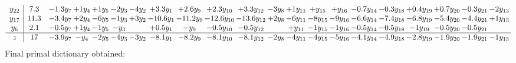 \documentclass[11pt]{article}
\begin{document}
\[\begin{array}{c| c c@{\hskip 2pt} c@{\hskip 2pt} c@{\hskip 2pt} c@{\hskip 2pt} c@{\hskip 2pt} c@{\hskip 2pt} c@{\hskip 2pt} c@{\hskip 2pt} c@{\hskip 2pt} c@{\hskip 2pt} c@{\hskip 2pt} c@{\hskip 2pt} c@{\hskip 2pt} c@{\hskip 2pt} c@{\hskip 2pt} c@{\hskip 2pt} c@{\hskip 2pt} c@{\hskip 2pt} c@{\hskip 2pt} }
 y_{22}   &  7.3 & -1.3 y_{7} & + 1 y_{4} & + 1 y_{5} & -2 y_{3} & -4 y_{2} & + 3.3 y_{1} & + 2.6 y_{9} & + 2.3 y_{10} & + 3.3 y_{12} & -3 y_{8} & + 1 y_{11} & +  y_{15} & +  y_{16} & -0.7 y_{14} & -0.3 y_{18} & + 0.4 y_{19} & + 0.7 y_{20} & -0.3 y_{21} & -2 y_{13}\\
 y_{17}   &  11.3 & -3.4 y_{7} & + 2 y_{4} & -6 y_{5} & -1 y_{3} & + 3 y_{2} & -10.6 y_{1} & -11.2 y_{9} & -12.6 y_{10} & -13.6 y_{12} & + 2 y_{8} & -6 y_{11} & -8 y_{15} & -9 y_{16} & -6.6 y_{14} & -7.4 y_{18} & -6.8 y_{19} & -5.4 y_{20} & -4.4 y_{21} & + 1 y_{13}\\
 y_{6}   &  2.1 & -0.5 y_{7} & + 1 y_{4} & -1 y_{5} & - y_{3} &   & + 0.5 y_{1} & - y_{9} & -0.5 y_{10} & -0.5 y_{12} &   & +  y_{11} & -1 y_{15} & -1 y_{16} & -0.5 y_{14} & -0.5 y_{18} & -1 y_{19} & -0.5 y_{20} & -0.5 y_{21} &   \\
\hline
z    &  17 & -3.9 y_{7} & - y_{4} & -2 y_{5} & -4 y_{3} & -3 y_{2} & -8.1 y_{1} & -8.2 y_{9} & -8.1 y_{10} & -8.1 y_{12} & -2 y_{8} & -4 y_{11} & -4 y_{15} & -5 y_{16} & -4.1 y_{14} & -4.9 y_{18} & -2.8 y_{19} & -1.9 y_{20} & -1.9 y_{21} & -1 y_{13}\\
\end{array}\]
 Final primal dictionary obtained: 
\end{document}
